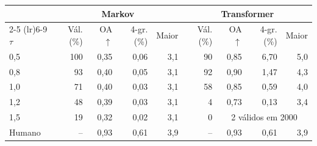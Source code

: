 \begin{tabular}{lrrrrrrrr}
\toprule
 & \multicolumn{4}{c}{Markov} & \multicolumn{4}{c}{Transformer} \\
\cmidrule(lr){2-5} \cmidrule(lr){6-9}
$\tau$ & Vál. (\%) & OA $\uparrow$ & 4-gr. (\%) & Maior & Vál. (\%) & OA $\uparrow$ & 4-gr. (\%) & Maior \\
\midrule
0,5 & 100 & 0,35 & 0,06 & 3,1 & 90 & 0,85 & 6,70 & 5,0 \\
0,8 & 93 & 0,40 & 0,05 & 3,1 & 92 & 0,90 & 1,47 & 4,3 \\
1,0 & 71 & 0,40 & 0,03 & 3,1 & 58 & 0,85 & 0,59 & 4,0 \\
1,2 & 48 & 0,39 & 0,03 & 3,1 & 4 & 0,73 & 0,13 & 3,4 \\
1,5 & 19 & 0,32 & 0,02 & 3,1 & 0 & \multicolumn{3}{c}{2 válidos em 2000} \\
\midrule
Humano & -- & 0,93 & 0,61 & 3,9 & -- & 0,93 & 0,61 & 3,9 \\
\bottomrule
\end{tabular}

